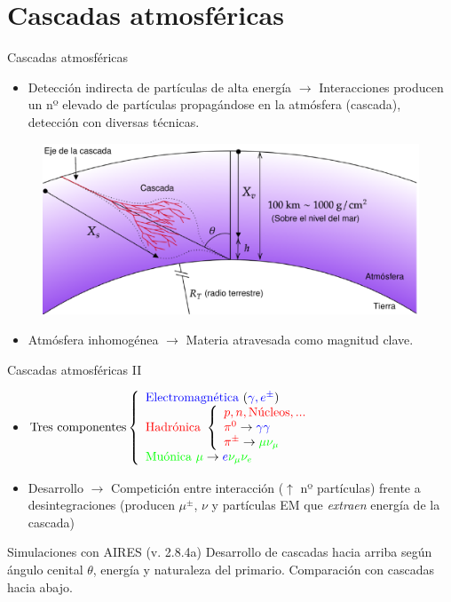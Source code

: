 \documentclass{beamer}
\begin{document}
	\section{Cascadas atmosféricas}
	\begin{frame}{Cascadas atmosféricas}
		\begin{itemize}
			\item Detección indirecta de partículas de alta energía $\rightarrow$ Interacciones producen un nº elevado de partículas propagándose en la atmósfera (cascada), detección con diversas técnicas.
		\end{itemize}
			\begin{figure}[H]
				\centering
				\includegraphics[width=.7\linewidth]{figures/cascadas/shower_params_v2}
			\end{figure}
		\begin{itemize}
			\item Atmósfera inhomogénea $\rightarrow$ Materia atravesada como magnitud clave. 
		\end{itemize}
	\end{frame}
\begin{frame}{Cascadas atmosféricas II}
	\begin{itemize}
		\item $\text{Tres componentes}\left\{\begin{array}{l}\text{\color{blue}Electromagnética } ({\color{blue}\gamma, e^\pm})\\\text{\color{red}Hadrónica }\left\{\begin{array}{l}\color{red} p, n, \text{Núcleos}, ...\\\color{red}\pi^0\color{black}\rightarrow\color{blue}\gamma\gamma\\\color{red}\pi^\pm\color{black}\rightarrow\color{green}\mu\nu_\mu\end{array}\right. \\\text{\color{green}Muónica } \color{green}\mu\color{black}\rightarrow\color{blue}e\color{green}\nu_\mu\nu_e\end{array}\right.$
		\color{black}
		\item Desarrollo $\rightarrow$ Competición entre interacción ($\uparrow$ nº partículas) frente a desintegraciones (producen $\mu^\pm$, $\nu$ y partículas EM que \textit{extraen} energía de la cascada)
	\end{itemize}
\pause\begin{block}{\centering Simulaciones con AIRES (v. 2.8.4a)}
	\centering Desarrollo de cascadas hacia arriba según ángulo cenital $\theta$, energía y naturaleza del primario. Comparación con cascadas hacia abajo.
\end{block}
\end{frame}
\end{document}

